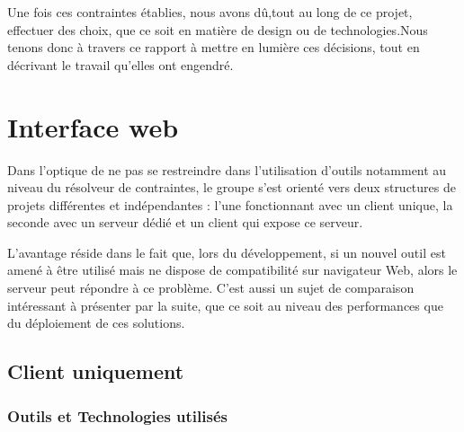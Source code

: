 \documentclass[
  12pt,
]{article}
\begin{document}
Une fois ces contraintes établies, nous avons dû,tout au long de ce
projet, effectuer des choix, que ce soit en matière de design ou de
technologies.Nous tenons donc à travers ce rapport à mettre en lumière
ces décisions, tout en décrivant le travail qu'elles ont engendré.

\newpage

\hypertarget{interface-web}{%
\section{Interface web}\label{interface-web}}

Dans l'optique de ne pas se restreindre dans l'utilisation d'outils
notamment au niveau du résolveur de contraintes, le groupe s'est orienté
vers deux structures de projets différentes et indépendantes : l'une
fonctionnant avec un client unique, la seconde avec un serveur dédié et
un client qui expose ce serveur.

L'avantage réside dans le fait que, lors du développement, si un nouvel
outil est amené à être utilisé mais ne dispose de compatibilité sur
navigateur Web, alors le serveur peut répondre à ce problème. C'est
aussi un sujet de comparaison intéressant à présenter par la suite, que
ce soit au niveau des performances que du déploiement de ces solutions.

\hypertarget{client-uniquement}{%
\subsection{Client uniquement}\label{client-uniquement}}

\hypertarget{outils-et-technologies-utilisuxe9s}{%
\subsubsection{Outils et Technologies
utilisés}\label{outils-et-technologies-utilisuxe9s}}
\end{document}

